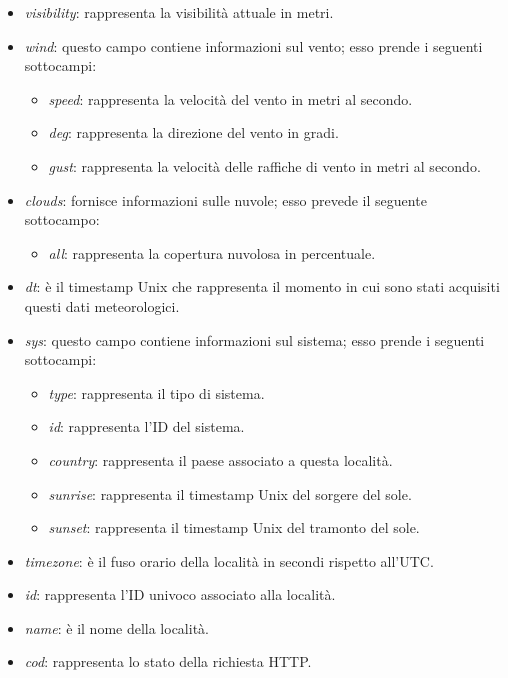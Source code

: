 \begin{itemize}
    \item \textit{visibility}: rappresenta la visibilità attuale in metri.
    \item \textit{wind}: questo campo contiene informazioni sul vento; esso prende i seguenti sottocampi:
    \begin{itemize}
        \item \textit{speed}: rappresenta la velocità del vento in metri al secondo.
        \item \textit{deg}: rappresenta la direzione del vento in gradi.
        \item \textit{gust}: rappresenta la velocità delle raffiche di vento in metri al secondo.
    \end{itemize}
    
    \item \textit{clouds}: fornisce informazioni sulle nuvole; esso prevede il seguente sottocampo:
    \begin{itemize}
        \item \textit{all}: rappresenta la copertura nuvolosa in percentuale.
    \end{itemize}
        
    \item \textit{dt}: è il timestamp Unix che rappresenta il momento in cui sono stati acquisiti questi dati meteorologici.
    \item \textit{sys}: questo campo contiene informazioni sul sistema; esso prende i seguenti sottocampi:
    \begin{itemize}
        \item \textit{type}: rappresenta il tipo di sistema.
        \item \textit{id}: rappresenta l'ID del sistema.
        \item \textit{country}: rappresenta il paese associato a questa località.
        \item \textit{sunrise}: rappresenta il timestamp Unix del sorgere del sole.
        \item \textit{sunset}: rappresenta il timestamp Unix del tramonto del sole.
    \end{itemize}
        
    \item \textit{timezone}: è il fuso orario della località in secondi rispetto all'UTC. 
    \item \textit{id}: rappresenta l'ID univoco associato alla località.
    \item \textit{name}: è il nome della località.
    \item \textit{cod}: rappresenta lo stato della richiesta HTTP.
\end{itemize}

